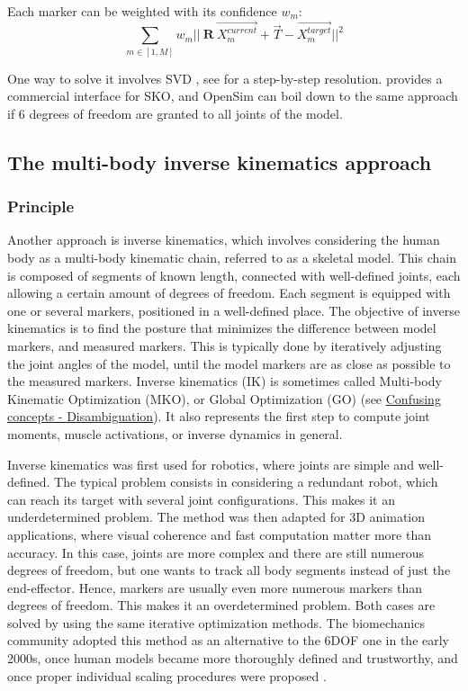 Each marker can be weighted with its confidence $w_m$:
\begin{equation}\label{eq:weighted_sko}
  \sum_{m \in [1,M]}
  w_m ||\ \textbf{R} \ \overrightarrow{X^{current}_m} + \overrightarrow{T} - \overrightarrow{X^{target}_m} ||^2
\end{equation} 

One way to solve it involves SVD \cite{Arun1987,Soderkvist1993}, see \cite{Sorkine2017} for a step-by-step resolution. \cite{Visual3D} provides a commercial interface for SKO, and OpenSim can boil down to the same approach if 6 degrees of freedom are granted to all joints of the model.


\newpage
\subsection{The multi-body inverse kinematics approach}\label{invkin}

\subsubsection{Principle}

Another approach is inverse kinematics, which involves considering the human body as a multi-body kinematic chain, referred to as a skeletal model. This chain is composed of segments of known length, connected with well-defined joints, each allowing a certain amount of degrees of freedom. Each segment is equipped with one or several markers, positioned in a well-defined place. The objective of inverse kinematics is to find the posture that minimizes the difference between model markers, and measured markers. This is typically done by iteratively adjusting the joint angles of the model, until the model markers are as close as possible to the measured markers. Inverse kinematics (IK) is sometimes called Multi-body Kinematic Optimization (MKO), or Global Optimization (GO) \cite{Begon2018} (see \hyperlink{Ann:gloss}{Confusing concepts - Disambiguation}). It also represents the first step to compute joint moments, muscle activations, or inverse dynamics in general.

Inverse kinematics was first used for robotics, where joints are simple and well-defined. The typical problem consists in considering a redundant robot, which can reach its target with several joint configurations. This makes it an underdetermined problem. The method was then adapted for 3D animation applications, where visual coherence and fast computation matter more than accuracy. In this case, joints are more complex and there are still numerous degrees of freedom, but one wants to track all body segments instead of just the end-effector. Hence, markers are usually even more numerous markers than degrees of freedom. This makes it an overdetermined problem. Both cases are solved by using the same iterative optimization methods. The biomechanics community adopted this method as an alternative to the 6DOF one in the early 2000s, once human models became more thoroughly defined and trustworthy, and once proper individual scaling procedures were proposed \cite{Hicks2015}.


